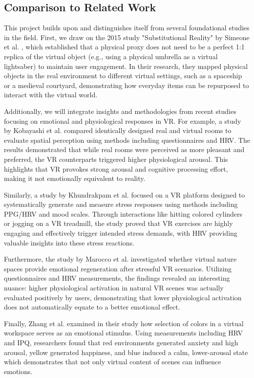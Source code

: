 \subsection*{Comparison to Related Work}
This project builds upon and distinguishes itself from several foundational studies in the field. First, we draw on the 2015 study "Substitutional Reality" by Simeone et al. \cite{substitutional-reality}, which established that a physical proxy does not need to be a perfect 1:1 replica of the virtual object (e.g., using a physical umbrella as a virtual lightsaber) to maintain user engagement. In their research, they mapped physical objects in the real environment to different virtual settings, such as a spaceship or a medieval courtyard, demonstrating how everyday items can be repurposed to interact with the virtual world.

Additionally, we will integrate insights and methodologies from recent studies focusing on emotional and physiological responses in VR. For example, a study by Kobayashi et al. \cite{Kobayashi.2025} compared identically designed real and virtual rooms to evaluate spatial perception using methods including questionnaires and HRV. The results demonstrated that while real rooms were perceived as more pleasant and preferred, the VR counterparts triggered higher physiological arousal. This highlights that VR provokes strong arousal and cognitive processing effort, making it not emotionally equivalent to reality.

Similarly, a study by Khundrakpam et al. \cite{Khundrakpam.2025} focused on a VR platform designed to systematically generate and measure stress responses using methods including PPG/HRV and mood scales. Through interactions like hitting colored cylinders or jogging on a VR treadmill, the study proved that VR exercises are highly engaging and effectively trigger intended stress demands, with HRV providing valuable insights into these stress reactions.

Furthermore, the study by Marocco et al. \cite{Marocco.2025} investigated whether virtual nature spaces provide emotional regeneration after stressful VR scenarios. Utilizing questionnaires and HRV measurements, the findings revealed an interesting nuance: higher physiological activation in natural VR scenes was actually evaluated positively by users, demonstrating that lower physiological activation does not automatically equate to a better emotional effect.

Finally, Zhang et al. \cite{Zhang.2025} examined in their study how selection of colors in a virtual workspace serves as an emotional stimulus. Using measurements including HRV and IPQ, researchers found that red environments generated anxiety and high arousal, yellow generated happiness, and blue induced a calm, lower-arousal state which demonstrates that not only virtual content of scenes can influence emotions.

